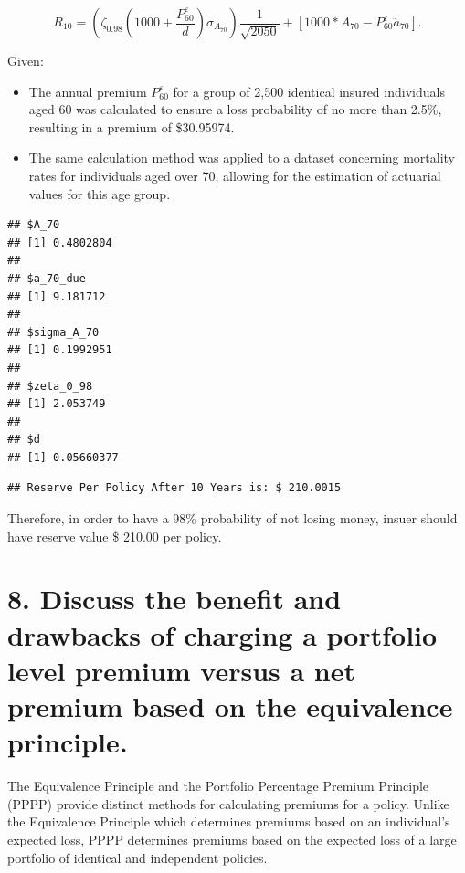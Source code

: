 \documentclass[
]{article}
\begin{document}
\[
R_{10}=\left(\zeta_{0.98}\left(1000+\frac{P_{60}^{\varepsilon}}{d}\right) \sigma_{A_{70}}\right) \frac{1}{\sqrt{2050}}+\left[1000*A_{70}-P_{60}^{\varepsilon} \ddot{a}_{70}\right].
\]

Given:

\begin{itemize}
\item
  The annual premium \(P_{60}^{\varepsilon}\) for a group of 2,500
  identical insured individuals aged 60 was calculated to ensure a loss
  probability of no more than 2.5\%, resulting in a premium of
  \$30.95974.
\item
  The same calculation method was applied to a dataset concerning
  mortality rates for individuals aged over 70, allowing for the
  estimation of actuarial values for this age group.
\end{itemize}

\begin{verbatim}
## $A_70
## [1] 0.4802804
## 
## $a_70_due
## [1] 9.181712
## 
## $sigma_A_70
## [1] 0.1992951
## 
## $zeta_0_98
## [1] 2.053749
## 
## $d
## [1] 0.05660377
\end{verbatim}

\begin{verbatim}
## Reserve Per Policy After 10 Years is: $ 210.0015
\end{verbatim}

Therefore, in order to have a 98\% probability of not losing money,
insuer should have reserve value \$ 210.00 per policy.

\hypertarget{discuss-the-benefit-and-drawbacks-of-charging-a-portfolio-level-premium-versus-a-net-premium-based-on-the-equivalence-principle.}{%
\section{8. Discuss the benefit and drawbacks of charging a portfolio
level premium versus a net premium based on the equivalence
principle.}\label{discuss-the-benefit-and-drawbacks-of-charging-a-portfolio-level-premium-versus-a-net-premium-based-on-the-equivalence-principle.}}

The Equivalence Principle and the Portfolio Percentage Premium Principle
(PPPP) provide distinct methods for calculating premiums for a policy.
Unlike the Equivalence Principle which determines premiums based on an
individual's expected loss, PPPP determines premiums based on the
expected loss of a large portfolio of identical and independent
policies.
\end{document}
